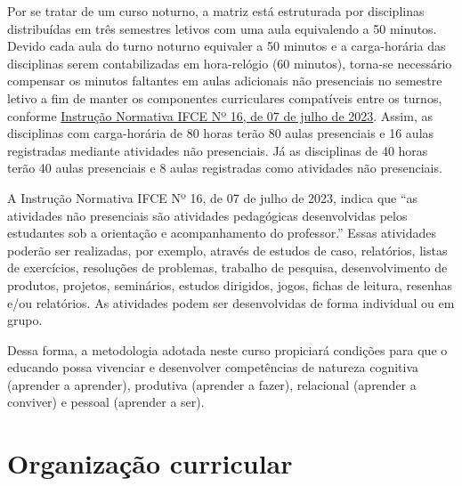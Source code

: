 \documentclass[
	12pt,				%
	openright,			%
	twoside,			%
	a4paper,			%
	chapter=TITLE,		%
	english,			%
	french,				%
	spanish,			%
	brazil,				%
	]{abntex2}
\begin{document}
Por se tratar de um curso  noturno, a matriz está estruturada por disciplinas
distribuídas em três semestres letivos com uma aula equivalendo a 50 minutos.
Devido cada aula do turno noturno equivaler a 50 minutos e a carga-horária das
disciplinas serem contabilizadas em hora-relógio (60 minutos), torna-se
necessário compensar os minutos faltantes em aulas adicionais não presenciais no
semestre letivo a fim de manter os componentes curriculares compatíveis entre os
turnos, conforme
\href{https://sei.ifce.edu.br/sei/modulos/pesquisa/md_pesq_documento_consulta_externa.php?pSdNG33E_H5RgkZP0Y1tBOG_OM2Qv61jOOoqx4oE7sNAWcCdIhmOMLz3x2VuFbFYA6o55XpOC_JbvRh_e41TnnlYiQfR74_ZQ4xraRCcRkpFd9zHQ3RL361JLigfqkwQ}{Instrução
Normativa IFCE Nº 16, de 07 de julho de 2023}. Assim, as disciplinas com
carga-horária de 80 horas terão 80 aulas presenciais e 16 aulas
registradas mediante atividades não presenciais. Já as disciplinas de 40 horas
terão 40 aulas presenciais  e 8 aulas registradas como atividades
não presenciais.

A Instrução Normativa IFCE Nº 16, de 07 de julho de 2023, indica que ``as
atividades não presenciais são atividades pedagógicas desenvolvidas pelos
estudantes sob a orientação e acompanhamento do professor.'' Essas atividades
poderão ser realizadas, por exemplo, através de estudos de caso, relatórios, listas
de exercícios, resoluções de problemas, trabalho de pesquisa, desenvolvimento de
produtos, projetos, seminários, estudos dirigidos, jogos, fichas de leitura, resenhas
e/ou relatórios. As atividades podem ser desenvolvidas de forma individual ou em
grupo.


Dessa forma, a metodologia adotada neste curso propiciará condições para que o
educando possa vivenciar e desenvolver  competências de natureza cognitiva (aprender a
aprender), produtiva (aprender a fazer), relacional (aprender a conviver) e
pessoal (aprender a ser).



\chapter{Organização curricular} 
\end{document}
